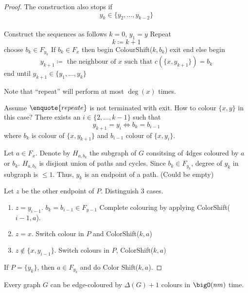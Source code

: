\documentclass[aagt.tex]{subfiles}
\begin{document}
\begin{proof}
  The construction also stops if 
  \[ y_k \in \{y_2,\dots,y_{k-2}\} \]
  \\
  
  Construct the sequences as follows
  $k=0$, $y_1 = y$
  Repeat
    \[ k \coloneqq k+1 \]
    choose $b_k \in F_{y_k}$
    If $b_k \in F_x$ then begin
      ColourShift($k,b_k$)
      exit
    end
    else begin
        \[ y_{k+1} \coloneqq \text{ the neighbour of } x \text{ such that } c(\{x,y_{k+1}\}) = b_k \]
    end
  until $y_{k+1} \in \{y_1,\dots,y_k\}$
  
  Note that \enquote{repeat} will perform at most $\deg(x)$ times.
  
  Assume $\enquote{repeate}$ is not terminated with exit.
  How to colour $\{x,y\}$ in this case?
  There exists an $i \in \{2,\dots,k-1\}$ such that 
  \[ y_{k+1} = y_i \iff b_k = b_{i-1} \]
  where $b_k$ is colour of $\{x,y_{k+1}\}$ and $b_{i-1}$ colour of $\{x,y_i\}$.
  
  Let $a \in F_x$. Denote by $H_{a,b_k}$ the subgraph of $G$ consitsing of 4dges coloured by $a$ or $b_k$.
  $H_{a,b_k}$ is disjiont union of paths and cycles.
  Since $b_k \in F_{y_k}$, degree of $y_k$ in subgraph is $\leq 1$.
  Thus, $y_k$ is an endpoint of a path. (Could be empty)
  
  Let $z$ be the other endpoint of $P$.
  Distinguish 3 cases.
  \begin{enumerate}
    \item $z= y_{i-1}$. $b_k = b_{i-1} \in F_{y-1}$ 
    Complete colouring by applying ColorShift($i-1,a$).
    \item $z = x$. 
    Switch colour in $P$ and ColorShift($k,a$)
    \item $z \notin \{x,y_{i-1}\}$. 
    Switch colours in $P$, ColorShift($k,a$)
  \end{enumerate}
  If $P = \{y_k\}$, then $a \in F_{y_k}$ and do Color Shift($k,a$).
\end{proof}

\begin{cor}
  Every graph $G$ can be edge-coloured by $\Delta(G) + 1$ colours in $\bigO(nm)$ time.
\end{cor}
\end{document}
